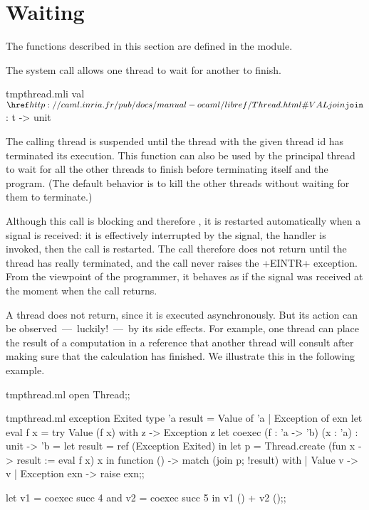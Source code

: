 \section{Waiting}

The functions described in this section are defined in the
 module.\medskip

The system call  allows one thread to wait for another
to finish.
%
\begin{listingcodefile}{tmpthread.mli}
val $\libvalue{Thread}{join}$ : t -> unit
\end{listingcodefile}
%
The calling thread is suspended until the thread with the given
thread id has terminated its execution. This function can also be used
by the principal thread to wait for all the other threads to finish
before terminating itself and the program. (The default behavior is to
kill the other threads without waiting for them to terminate.)

Although this call is blocking and therefore , it
is restarted automatically when a signal is received: it is
effectively interrupted by the signal, the handler is invoked, then the
call is restarted.  The call therefore does not return until the
thread has really terminated, and the call never raises the \ml+EINTR+
exception.  From the viewpoint of the {\ocaml} programmer, it behaves as
if the signal was received at the moment when the call returns.

A thread does not return, since it is executed asynchronously.  But
its action can be observed~---~luckily!~---~by its side effects.  For
example, one thread can place the result of a computation in a
reference that another thread will consult after making sure that the
calculation has finished.  We illustrate this in the following
example.
%
\begin{codefile}{tmpthread.ml}
open Thread;;
\end{codefile}
\begin{listingcodefile}{tmpthread.ml}
exception Exited
type 'a result = Value of 'a | Exception of exn
let eval f x = try Value (f x) with z -> Exception z 
let coexec (f : 'a -> 'b) (x : 'a) : unit -> 'b = 
  let result = ref (Exception Exited) in 
  let p = Thread.create (fun x -> result := eval f x) x in
  function () -> match (join p; !result) with 
    | Value v -> v
    | Exception exn -> raise exn;;

let v1 = coexec succ 4 and v2 = coexec succ 5 in v1 () + v2 ();;
\end{listingcodefile}

